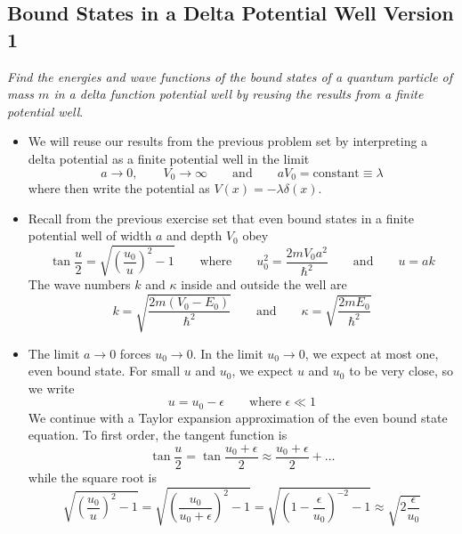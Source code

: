 \documentclass[11pt, a4paper]{article}
\newcommand{\eqtext}[1]{\qquad \text{#1} \qquad}
\begin{document}
\subsection{Bound States in a Delta Potential Well Version 1}
\textit{Find the energies and wave functions of the bound states of a quantum particle of mass $ m $ in a delta function potential well by reusing the results from a finite potential well}. 
\begin{itemize}
	\item We will reuse our results from the previous problem set by interpreting a delta potential as a finite potential well in the limit 
	\begin{equation*}
		a \to 0, \qquad V_{0} \to \infty \eqtext{and} aV_{0} = \text{constant} \equiv \lambda 
	\end{equation*}
	where then write the potential as $ V(x) = - \lambda \delta(x) $. 
	
	\item Recall from the previous exercise set that even bound states in a finite potential well of width $ a $ and depth $ V_{0} $ obey
	\begin{equation*}
		\tan \frac{u}{2} = \sqrt{\left(\frac{u_{0}}{u}\right)^{2} -1} \eqtext{where} u_{0}^{2} = \frac{2mV_{0}a^{2}}{\hbar^{2}} \eqtext{and} u = ak
	\end{equation*}
	The wave numbers $ k $ and $ \kappa $ inside and outside the well are
	\begin{equation*}
		k = \sqrt{\frac{2m(V_{0}- E_{0})}{\hbar^{2}}} \eqtext{and} \kappa = \sqrt{\frac{2mE_{0}}{\hbar^{2}}}
	\end{equation*}
	
	\item The limit $ a \to 0 $ forces $ u_{0} \to 0 $. In the limit $ u_{0} \to 0 $, we expect at most one, even bound state.	For small $ u $ and $ u_{0} $, we expect $ u $ and $ u_{0} $ to be very close, so we write
	\begin{equation*}
		u = u_{0} - \epsilon \qquad \text{where } \epsilon \ll 1
	\end{equation*}
	We continue with a Taylor expansion approximation of the even bound state equation. To first order, the tangent function is
	\begin{equation*}
		\tan \frac{u}{2} = \tan \frac{u_{0} + \epsilon}{2} \approx \frac{u_{0} + \epsilon}{2} + \dots 
	\end{equation*}
	while the square root is
	\begin{equation*}
		\sqrt{\left(\frac{u_{0}}{u}\right)^{2} -1} = \sqrt{\left(\frac{u_{0}}{u_{0} + \epsilon}\right)^{2} -1} = \sqrt{\left(1 - \frac{\epsilon}{u_{0}}\right)^{-2} -1} \approx \sqrt{2\frac{\epsilon}{u_{0}}}
	\end{equation*}
	

\end{itemize}
\end{document}
